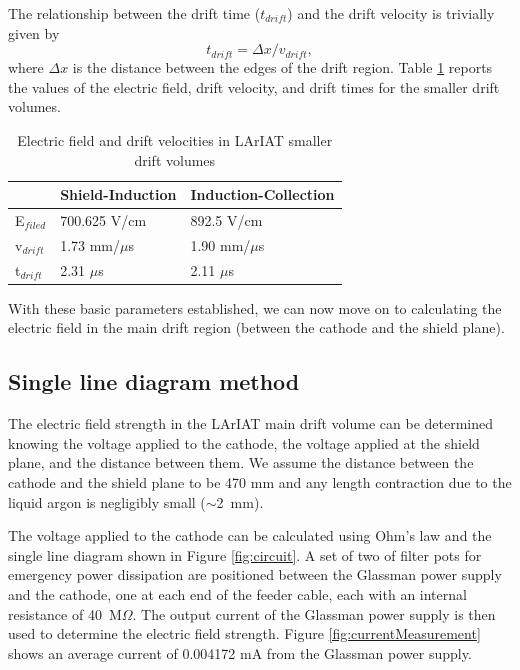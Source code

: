 The relationship between the drift time ($t_{drift}$) and the drift velocity is trivially given by
\begin{equation}
t_{drift} = \Delta x/v_{drift}, \label{eq:drifttime}
\end{equation}
where $\Delta x$ is the distance between the edges of the drift region.
Table \ref{tab:Efields} reports the values of the electric field, drift velocity, and drift times for the smaller drift volumes. 

\begin{table}[]
\centering
\caption{Electric field and drift velocities in LArIAT smaller drift volumes}
\label{tab:Efields}
\begin{tabular}{|l|l|l|}
\hline
& Shield-Induction & Induction-Collection \\ \hline
E$_{filed}$ &                 700.625 V/cm        &                892.5  V/cm             \\ \hline
v$_{drift}$ &                   1.73  mm/$\mu$s   &                  1.90 mm/$\mu$s        \\ \hline
t$_{drift}$ &                   2.31  $\mu$s      &                   2.11 $\mu$s          \\ \hline

\end{tabular}
\end{table}

With these basic parameters established, we can now move on to calculating the electric field in the main drift region (between the cathode and the shield plane).

\subsection*{Single line diagram method}
The electric field strength in the LArIAT main drift volume can be determined knowing the voltage applied to the cathode, the voltage applied at the shield plane, and the distance between them. We assume the distance between the cathode and the shield plane to be 470 mm and any length contraction due to the liquid argon is negligibly small ($\sim$2~mm).

The voltage applied to the cathode can be calculated using Ohm's law and the single line diagram shown in Figure \ref{fig:circuit}.  A set of two of filter pots for emergency power dissipation are positioned between the Glassman power supply and the cathode, one at each end of the feeder cable, each with an internal resistance of 40~M$\Omega$.  The output current of the Glassman power supply is then used to determine the electric field strength.  Figure \ref{fig:currentMeasurement} shows an average current of 0.004172 mA from the Glassman power supply.  

